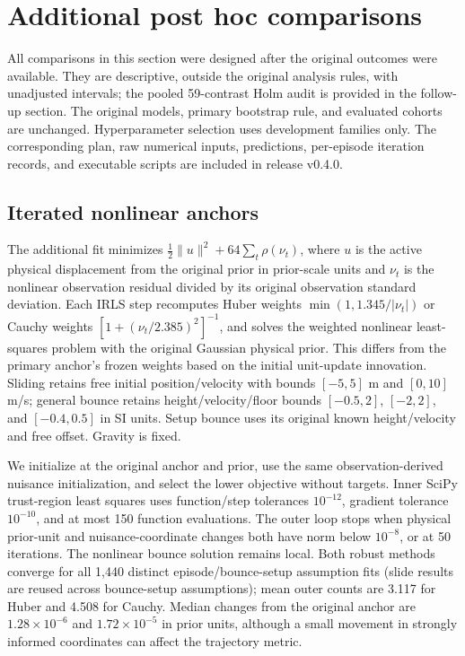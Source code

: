 \section{Additional post hoc comparisons}\label{sec:extended}
All comparisons in this section were designed after the original outcomes were available. They are descriptive, outside the original analysis rules, with unadjusted intervals; the pooled 59-contrast Holm audit is provided in the follow-up section. The original models, primary bootstrap rule, and evaluated cohorts are unchanged. Hyperparameter selection uses development families only. The corresponding plan, raw numerical inputs, predictions, per-episode iteration records, and executable scripts are included in release v0.4.0.

\subsection{Iterated nonlinear anchors}
The additional fit minimizes $\frac12\|u\|^2+64\sum_t\rho(\nu_t)$, where $u$ is the active physical displacement from the original prior in prior-scale units and $\nu_t$ is the nonlinear observation residual divided by its original observation standard deviation. Each IRLS step recomputes Huber weights $\min(1,1.345/|\nu_t|)$ or Cauchy weights $[1+(\nu_t/2.385)^2]^{-1}$, and solves the weighted nonlinear least-squares problem with the original Gaussian physical prior. This differs from the primary anchor's frozen weights based on the initial unit-update innovation. Sliding retains free initial position/velocity with bounds $[-5,5]$ m and $[0,10]$ m/s; general bounce retains height/velocity/floor bounds $[-0.5,2]$, $[-2,2]$, and $[-0.4,0.5]$ in SI units. Setup bounce uses its original known height/velocity and free offset. Gravity is fixed.

We initialize at the original anchor and prior, use the same observation-derived nuisance initialization, and select the lower objective without targets. Inner SciPy trust-region least squares uses function/step tolerances $10^{-12}$, gradient tolerance $10^{-10}$, and at most 150 function evaluations. The outer loop stops when physical prior-unit and nuisance-coordinate changes both have norm below $10^{-8}$, or at 50 iterations. The nonlinear bounce solution remains local. Both robust methods converge for all 1,440 distinct episode/bounce-setup assumption fits (slide results are reused across bounce-setup assumptions); mean outer counts are 3.117 for Huber and 4.508 for Cauchy. Median changes from the original anchor are $1.28\times10^{-6}$ and $1.72\times10^{-5}$ in prior units, although a small movement in strongly informed coordinates can affect the trajectory metric.

